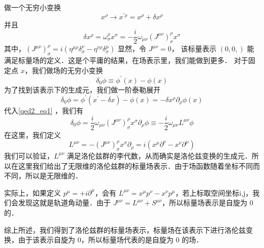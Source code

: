 \begin{corollary}{}
做一个无穷小变换
\begin{equation}
x^{\rho} \rightarrow x^{\prime \rho}=x^{\rho}+\delta x^{\rho}
\end{equation}
并且
\begin{equation}\label{qed2_eq1}
\delta x^{\rho}=\omega_{\sigma}^{\rho} x^{\sigma}=-\frac{i}{2} \omega_{\mu \nu}\left(J^{\mu \nu}\right)_{\sigma}^{\rho} x^{\sigma}
\end{equation}
其中，$\left(J^{\mu \nu}\right)_{\sigma}^{\rho}=i\left(\eta^{\mu \rho} \delta_{\sigma}^{\nu}-\eta^{\nu \rho} \delta_{\sigma}^{\mu}\right)$
显然，令 $J^{\mu \nu}=0$， 该标量表示 $(0,0,)$ 能满足标量场的定义．这是个平庸的结果，在场表示里，我们能做到更多． 对于固定点 $x$，我们做场的无穷小变换
\begin{equation}
\delta_{0} \phi \equiv \phi^{\prime}(x)-\phi(x)
\end{equation}
为了找到该表示下的生成元，我们做一阶泰勒展开
\begin{equation}
\delta_{0} \phi=\phi^{\prime}\left(x^{\prime}-\delta x\right)-\phi(x)=-\delta x^{\rho} \partial_{\rho} \phi(x)
\end{equation}
代入\autoref{qed2_eq1} ，我们有
\begin{equation}
\delta_{0} \phi=\frac{i}{2} \omega_{\mu \nu}\left(J^{\mu \nu}\right)_{\sigma}^{\rho} x^{\sigma} \partial_{\rho} \phi \equiv-\frac{i}{2} \omega_{\mu \nu} L^{\mu \nu} \phi
\end{equation}
在这里，我们定义
\begin{equation}
L^{\mu \nu}=-\left(J^{\mu \nu}\right)_{\sigma}^{\rho} x^{\sigma} \partial_{\rho}=i\left(x^{\mu} \partial^{\nu}-x^{\nu} \partial^{\mu}\right)
\end{equation}
我们可以验证，$L^{\mu \nu}$ 满足洛伦兹群的李代数，从而确实是洛伦兹变换的生成元．所以在这里我们给出了无限维的洛伦兹群的标量场表示．由于场函数随着坐标不同而不同，所以是无限维的．

实际上，如果定义 $p^{\mu}=+i \partial^{\mu}$，会有 $L^{\mu \nu}=x^{\mu} p^{\nu}-x^{\nu} p^{\mu}$，若上标取空间坐标i,j，我们会发现这就是轨道角动量．由于 $J^{\mu \nu}=L^{\mu \nu}+S^{\mu \nu}$，所以标量场表示是自旋为 0 的．

综上所述，我们得到了洛伦兹群的标量场表示，标量场在该表示下进行洛伦兹变换，由于该表示自旋为 0，所以标量场代表的是自旋为 0 的场．
\end{corollary}

